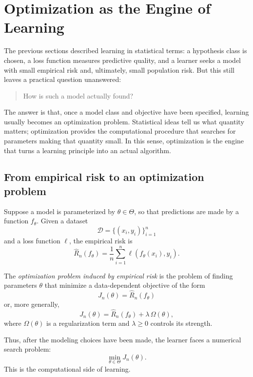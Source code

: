 \section{Optimization as the Engine of Learning}

The previous sections described learning in statistical terms: a hypothesis class is chosen, a loss function measures predictive quality, and a learner seeks a model with small empirical risk and, ultimately, small population risk. But this still leaves a practical question unanswered:

\begin{quote}
How is such a model actually found?
\end{quote}

The answer is that, once a model class and objective have been specified, learning usually becomes an optimization problem. Statistical ideas tell us what quantity matters; optimization provides the computational procedure that searches for parameters making that quantity small. In this sense, optimization is the engine that turns a learning principle into an actual algorithm.

\subsection*{From empirical risk to an optimization problem}

Suppose a model is parameterized by $\theta\in\Theta$, so that predictions are made by a function $f_\theta$. Given a dataset
\[
\mathcal D=\{(x_i,y_i)\}_{i=1}^n
\]
and a loss function $\ell$, the empirical risk is
\[
\widehat R_n(f_\theta)=\frac1n\sum_{i=1}^n \ell(f_\theta(x_i),y_i).
\]

\begin{definition}
The \emph{optimization problem induced by empirical risk} is the problem of finding parameters $\theta$ that minimize a data-dependent objective of the form
\[
J_n(\theta)=\widehat R_n(f_\theta)
\]
or, more generally,
\[
J_n(\theta)=\widehat R_n(f_\theta)+\lambda\,\Omega(\theta),
\]
where $\Omega(\theta)$ is a regularization term and $\lambda\ge 0$ controls its strength.
\end{definition}

Thus, after the modeling choices have been made, the learner faces a numerical search problem:
\[
\min_{\theta\in\Theta} J_n(\theta).
\]
This is the computational side of learning.

